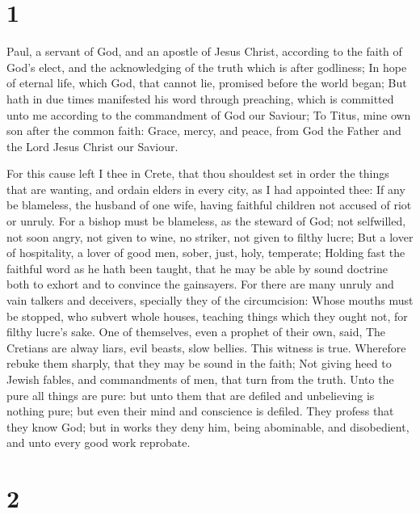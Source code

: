 \hypertarget{section}{%
\section{1}\label{section}}

 Paul, a servant of God, and an apostle of Jesus Christ,
according to the faith of God's elect, and the acknowledging of the
truth which is after godliness;  In hope of eternal life,
which God, that cannot lie, promised before the world began;
 But hath in due times manifested his word through
preaching, which is committed unto me according to the commandment of
God our Saviour;  To Titus, mine own son after the common
faith: Grace, mercy, and peace, from God the Father and the Lord Jesus
Christ our Saviour.

 For this cause left I thee in Crete, that thou shouldest
set in order the things that are wanting, and ordain elders in every
city, as I had appointed thee:  If any be blameless, the
husband of one wife, having faithful children not accused of riot or
unruly.  For a bishop must be blameless, as the steward of
God; not selfwilled, not soon angry, not given to wine, no striker, not
given to filthy lucre;  But a lover of hospitality, a lover
of good men, sober, just, holy, temperate;  Holding fast the
faithful word as he hath been taught, that he may be able by sound
doctrine both to exhort and to convince the gainsayers. 
For there are many unruly and vain talkers and deceivers, specially they
of the circumcision:  Whose mouths must be stopped, who
subvert whole houses, teaching things which they ought not, for filthy
lucre's sake.  One of themselves, even a prophet of their
own, said, The Cretians are alway liars, evil beasts, slow bellies.
 This witness is true. Wherefore rebuke them sharply, that
they may be sound in the faith;  Not giving heed to Jewish
fables, and commandments of men, that turn from the truth. 
Unto the pure all things are pure: but unto them that are defiled and
unbelieving is nothing pure; but even their mind and conscience is
defiled.  They profess that they know God; but in works
they deny him, being abominable, and disobedient, and unto every good
work reprobate.

\hypertarget{section-1}{%
\section{2}\label{section-1}}

